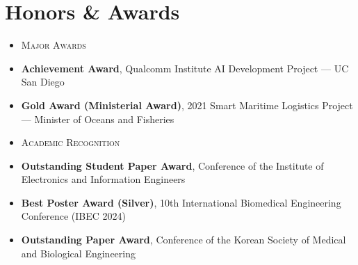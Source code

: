 \documentclass[letterpaper,11pt]{article}
\newcommand{\resumeSubLabel}[1]{\item {\scshape\small #1}\vspace{-3pt}}
\newcommand{\resumeSubHeadingListStart}{\begin{itemize}[leftmargin=0.15in, label={}]}
\newcommand{\resumeSubHeadingListEnd}{\end{itemize}}
\begin{document}
\section{Honors \& Awards}
  \resumeSubHeadingListStart
    \resumeSubLabel{Major Awards}
    \item\small{\textbf{Achievement Award}, Qualcomm Institute AI Development Project --- UC San Diego}
    \item\small{\textbf{Gold Award (Ministerial Award)}, 2021 Smart Maritime Logistics Project --- Minister of Oceans and Fisheries}
    \vspace{2pt}
    \resumeSubLabel{Academic Recognition}
    \item\small{\textbf{Outstanding Student Paper Award}, Conference of the Institute of Electronics and Information Engineers}
    \item\small{\textbf{Best Poster Award (Silver)}, 10th International Biomedical Engineering Conference (IBEC 2024)}
    \item\small{\textbf{Outstanding Paper Award}, Conference of the Korean Society of Medical and Biological Engineering}
  \resumeSubHeadingListEnd


\end{document}
